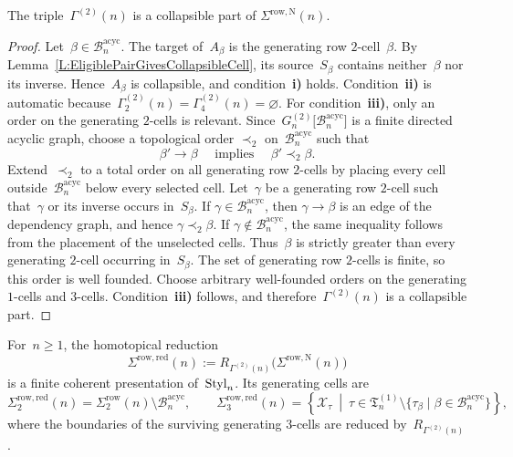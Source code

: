 \documentclass[a4paper, twoside, 11pt, english]{article}
\begin{document}
\begin{proposition}
\label{P:SecondAcyclicFamilyCollapsible}
The triple~$\Gamma^{(2)}(n)$ is a collapsible part of
$\Sigma^{\mathrm{row,N}}(n)$.
\end{proposition}

\begin{proof}
Let~$\beta\in\mathcal B_n^{\mathrm{acyc}}$. The target of~$A_\beta$
is the generating row $2$-cell~$\beta$. By
Lemma~\ref{L:EligiblePairGivesCollapsibleCell}, its source~$S_\beta$
contains neither~$\beta$ nor its inverse. Hence~$A_\beta$ is
collapsible, and condition~\textup{\textbf{i)}} holds.
Condition~\textup{\textbf{ii)}} is automatic because~$\Gamma_2^{(2)}(n)=\Gamma_4^{(2)}(n)=\varnothing$.
For condition~\textup{\textbf{iii)}}, only an order on the generating
$2$-cells is relevant. Since~$
G_n^{(2)}
\bigl[
\mathcal B_n^{\mathrm{acyc}}
\bigr]$
is a finite directed acyclic graph, choose a topological order
$\prec_2$ on~$\mathcal B_n^{\mathrm{acyc}}$ such that
\[
\beta'\longrightarrow\beta
\quad\text{ implies }\quad
\beta'\prec_2\beta.
\]
Extend~$\prec_2$ to a total order on all generating row $2$-cells by
placing every cell outside~$\mathcal B_n^{\mathrm{acyc}}$ below every
selected cell.
Let~$\gamma$ be a generating row $2$-cell such that~$\gamma$ or its
inverse occurs in~$S_\beta$. If
$\gamma\in\mathcal B_n^{\mathrm{acyc}}$, then
$\gamma\to\beta$ is an edge of the dependency graph, and hence
$\gamma\prec_2\beta$. If
$\gamma\notin\mathcal B_n^{\mathrm{acyc}}$, the same inequality follows
from the placement of the unselected cells. Thus~$\beta$ is strictly
greater than every generating $2$-cell occurring in~$S_\beta$.
The set of generating row $2$-cells is finite, so this order is well
founded. Choose arbitrary well-founded orders on the generating
$1$-cells and $3$-cells. Condition~\textup{\textbf{iii)}} follows, and
therefore~$\Gamma^{(2)}(n)$ is a collapsible part.
\end{proof}

\begin{theorem}
\label{T:SecondReductionRowRed}
For~$n\geq1$, the homotopical reduction
\[
\Sigma^{\mathrm{row,red}}(n)
:=
R_{\Gamma^{(2)}(n)}
\bigl(\Sigma^{\mathrm{row,N}}(n)\bigr)
\]
is a finite coherent presentation of~$\mathrm{Styl}_n$. Its generating cells are
\[
\Sigma^{\mathrm{row,red}}_2(n)
=
\Sigma^{\mathrm{row}}_2(n)
\setminus\mathcal B_n^{\mathrm{acyc}},
\qquad
\Sigma^{\mathrm{row,red}}_3(n)
=
\left\{
\mathcal X_\tau
\ \middle|\
\tau\in\mathfrak T_n^{(1)}
\setminus
\{\tau_\beta\mid\beta\in\mathcal B_n^{\mathrm{acyc}}\}
\right\},
\]
where the boundaries of the surviving generating $3$-cells are reduced
by~$R_{\Gamma^{(2)}(n)}$.
\end{theorem}
\end{document}

